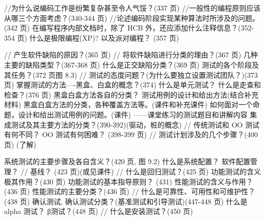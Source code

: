 \documentclass[14pt, letterpaper, UTF8, fontset=windowsnew, heading=true]{article}
\begin{document}
//为什么说编码工作是纷繁复杂甚至令人气馁？(337 页)
//一般性的编程原则应该从哪三个方面考虑？(340-344 页)
//论述编码阶段实现某种算法时所涉及的问题。(342 页)
在编写程序内部文档时，除了 HCB 外，还应添加什么注释信息？(352-354 页)
什么是极限编程(XP)? 以及派对编程？ (357 页)


// 产生软件缺陷的原因？(365 页)
// 将软件缺陷进行分类的理由？(367 页)
几种主要的缺陷类型？(367-368 页)
什么是正交缺陷分类？(369 页)
测试的各个阶段及其任务？(372 页图 8.3)
// 测试的态度问题？(为什么要独立设置测试团队？)(373 页)
掌握测试的方法----黑盒、白盒的概念？(374)
什么是单元测试？ 什么是走查和检查？(376 页)
黑盒白盒方法各自的分类？ 测试用例的设计和给出方法(结合补充材料)
黑盒白盒方法的分类，各种覆盖方法等。(课件和补充课件)
如何面对一个命题，设计和给出测试用例的问题。(课件)
------课堂练习的测试题目和讲解内容
集成测试及其主要方法的分类？(390-392)(驱动，桩的概念)
// 传统测试和 OO 测试有何不同？ OO 测试有何困难？ (398-399 页)
// 测试计划涉及的几个步骤？(400 页) (了解)


系统测试的主要步骤及各自含义？(420 页, 图 9.2)
什么是系统配置？ 软件配置管理？ // 基线？ (423 页)(或见课件)
// 什么是回归测试？(425 页)
功能测试的含义极其作用？(430 页)
功能测试的基本指导原则？ (431)
性能测试的含义与作用？(436 页)
性能测试的主要分类？(436 页)
// 什么是可靠性、可用性和可维护性？(438 页)
确认测试, 确认测试分类？(基准测试和引导测试)(447-448 页)
什么是 alpha 测试？ β测试？(448 页)
// 什么是安装测试？(450 页)
\end{document}
